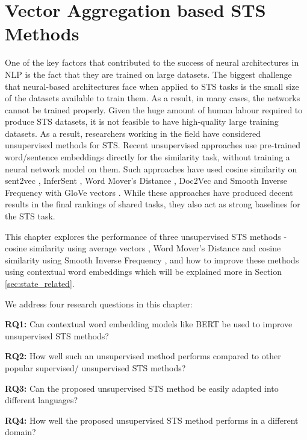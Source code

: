\chapter{\label{cha:sts_state_of_the_art_methods}Vector Aggregation based STS Methods}

One of the key factors that contributed to the success of neural architectures in NLP is the fact that they are trained on large datasets. The biggest challenge that neural-based architectures face when applied to STS tasks is the small size of the datasets available to train them. As a result, in many cases, the networks cannot be trained properly. Given the huge amount of human labour required to produce STS datasets, it is not feasible to have high-quality large training datasets. As a result, researchers working in the field have considered unsupervised methods for STS. Recent unsupervised approaches use pre-trained word/sentence embeddings directly for the similarity task, without training a neural network model on them. Such approaches have used cosine similarity on sent2vec \autocite{pagliardini-etal-2018-unsupervised}, InferSent \autocite{conneau-EtAl:2017:EMNLP2017}, Word Mover's Distance \autocite{pmlr-v32-le14}, Doc2Vec \autocite{pmlr-v32-le14} and Smooth Inverse Frequency with GloVe vectors \autocite{DBLP:conf/iclr/AroraLM17}. While these approaches have produced decent results in the final rankings of shared tasks, they also act as strong baselines for the STS task. 

This chapter explores the performance of three unsupervised STS methods - cosine similarity using average vectors \autocite{mitchell-lapata-2008-vector}, Word Mover's Distance \autocite{10.5555/3045118.3045221} and cosine similarity using Smooth Inverse Frequency \autocite{DBLP:conf/iclr/AroraLM17}, and how to improve these methods using contextual word embeddings which will be explained more in Section \ref{sec:state_related}. 

We address four research questions in this chapter:

\textbf{RQ1:} Can contextual word embedding models like BERT be used to improve unsupervised STS methods?

\textbf{RQ2:} How well such an unsupervised method performs compared to other popular supervised/ unsupervised STS methods?

\textbf{RQ3:} Can the proposed unsupervised STS method be easily adapted into different languages?

\textbf{RQ4:} How well the proposed unsupervised STS method performs in a different domain? 


